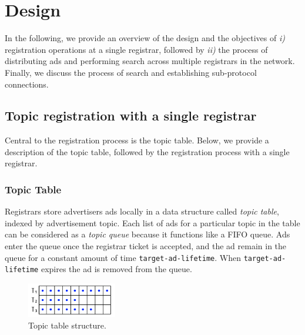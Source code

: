 
\section{Design}
\label{sec:design}

In the following, we provide an overview of the design and the objectives of \textit{i)} registration operations at a single registrar, followed by \textit{ii)} the process of distributing ads and performing search across multiple registrars in the network. Finally, we discuss the process of search and establishing sub-protocol connections. 

\subsection{Topic registration with a single registrar}\label{sec:registration_single}

Central to the registration process is the topic table. 
Below, we provide a description of the topic table, followed by the registration process with a single registrar. 

\subsubsection{Topic Table}
Registrars store advertisers ads locally in a data structure called \emph{topic table}, 
indexed by advertisement topic. 
Each list of ads for a particular topic in the table  can be considered as a \emph{topic queue} because it functions like a FIFO queue.
Ads enter the queue once the registrar ticket is accepted,  and
the ad remain in the queue for a constant amount of time \texttt{target-ad-lifetime}. 
When \texttt{target-ad-lifetime} expires the ad is removed  from the queue.

\begin{figure}
    \includegraphics[width=0.35\textwidth]{img/topic-queue-diagram.png}
    \caption{Topic table structure.}
    \label{fig:topic_table}
 \end{figure}

